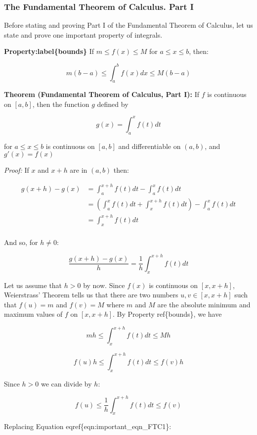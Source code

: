 \documentclass[11pt]{article}
\begin{document}
    \hypertarget{the-fundamental-theorem-of-calculus.-part-i}{%
\subsubsection{The Fundamental Theorem of Calculus. Part
I}\label{the-fundamental-theorem-of-calculus.-part-i}}

Before stating and proving Part I of the Fundamental Theorem of
Calculus, let us state and prove one important property of integrals.

\textbf{Property:label\{bounds\}} If \(m\leq f(x) \leq M\) for
\(a\leq x \leq b\), then:

\[
m(b-a) \leq \int^b_a f(x) dx \leq M(b-a) 
\]

\textbf{Theorem (Fundamental Theorem of Calculus, Part I):} If \(f\) is
continuous on \([a,b]\), then the function \(g\) defined by

\[
g(x) = \int^x_a f(t) dt
\]

for \(a\leq x \leq b\) is continuous on \([a,b]\) and differentiable on
\((a,b)\), and \(g'(x) = f(x)\)

\emph{Proof:} If \(x\) and \(x+h\) are in \((a,b)\) then:

\begin{align}
g(x+h) - g(x) &= \int^{x+h}_a f(t) dt - \int^x_a f(t) dt \\
&= \left(\int_a^x f(t) dt + \int_x^{x+h} f(t)dt\right) - \int^x_a f(t) dt \\
&= \int_x^{x+h} f(t)dt \\
\end{align}

And so, for \(h\neq 0\):

\[
\frac{g(x+h)-g(x)}{h} = \frac{1}{h}\int_x^{x+h} f(t) dt
\]

Let us assume that \(h>0\) by now. Since \(f(x)\) is continuous on
\([x,x+h]\), Weierstrass' Theorem tells us that there are two numbers
\(u,v\in[x,x+h]\) such that \(f(u) = m\) and \(f(v) = M\) where \(m\)
and \(M\) are the absolute minimum and maximum values of \(f\) on
\([x,x+h]\). By Property ref\{bounds\}, we have

\[
mh \leq \int^{x+h}_x f(t) dt \leq Mh
\]

\[
f(u)h \leq \int^{x+h}_x f(t) dt \leq f(v) h
\]

Since \(h>0\) we can divide by \(h\):

\[
f(u) \leq \frac{1}{h}\int^{x+h}_{x}f(t) dt \leq f(v)
\]

Replacing Equation eqref\{eqn:important\_eqn\_FTC1\}:
\end{document}

